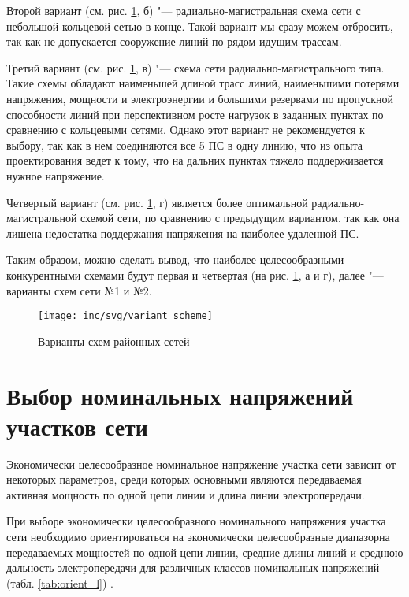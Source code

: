 Второй вариант (см. рис. \ref{fig:variant_scheme}, б) "--- радиально-магистральная схема сети с небольшой кольцевой сетью в конце. Такой вариант мы сразу можем отбросить, так как не допускается сооружение линий по рядом идущим трассам.

Третий вариант (см. рис. \ref{fig:variant_scheme}, в) "--- схема сети радиально-магистрального типа. Такие схемы обладают наименьшей длиной трасс линий, наименьшими потерями напряжения, мощности и электроэнергии и большими резервами по пропускной способности линий при перспективном росте нагрузок в заданных пунктах по сравнению с кольцевыми сетями. Однако этот вариант не рекомендуется к выбору, так как в нем соединяются все 5 ПС в одну линию, что из опыта проектирования ведет к тому, что на дальних пунктах тяжело поддерживается нужное напряжение.

Четвертый вариант (см. рис. \ref{fig:variant_scheme}, г) является более оптимальной радиально-магистральной схемой сети, по сравнению с предыдущим вариантом, так как она лишена недостатка поддержания напряжения на наиболее удаленной ПС.

Таким образом, можно сделать вывод, что наиболее целесообразными конкурентными схемами будут первая и четвертая (на рис. \ref{fig:variant_scheme}, а и г), далее "--- варианты схем сети №1 и №2.

\begin{figure}[h]
	\centering
	\texttt{[image: inc/svg/variant\_scheme]}
	\caption{Варианты схем районных сетей}
	\label{fig:variant_scheme}
\end{figure}


\section{Выбор номинальных напряжений участков сети}

Экономически целесообразное номинальное напряжение участка сети зависит от некоторых параметров, среди которых основными являются передаваемая активная мощность по одной цепи линии и длина линии электропередачи.

При выборе экономически целесообразного номинального напряжения участка сети необходимо ориентироваться на экономически целесообразные диапазорна передаваемых мощностей по одной цепи линии, средние длины линий и среднюю дальность электропередачи для различных классов номинальных напряжений (табл. \ref{tab:orient_l}) \cite{глазунов_шведов}.

